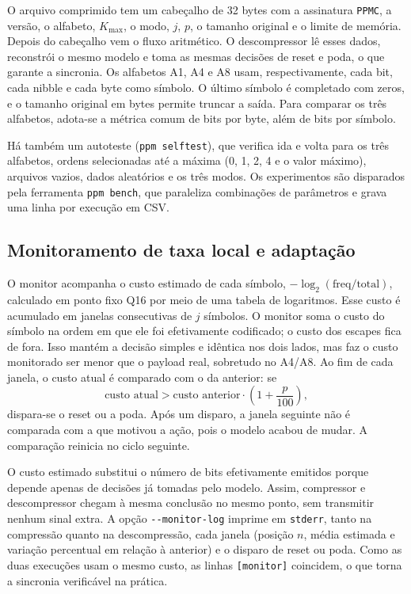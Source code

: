 \documentclass[12pt,a4paper]{article}
\begin{document}
O arquivo comprimido tem um cabe\c{c}alho de 32 bytes com a assinatura
\texttt{PPMC}, a vers\~ao, o alfabeto, $K_{\max}$, o modo, $j$, $p$, o tamanho
original e o limite de mem\'oria. Depois do cabe\c{c}alho vem o fluxo
aritm\'etico. O descompressor l\^e esses dados, reconstr\'oi o mesmo modelo e toma
as mesmas decis\~oes de reset e poda, o que garante a sincronia. Os alfabetos A1,
A4 e A8 usam, respectivamente, cada bit, cada nibble e cada byte como s\'imbolo. O
\'ultimo s\'imbolo \'e completado com zeros, e o tamanho original em bytes permite
truncar a sa\'ida. Para comparar os tr\^es alfabetos, adota-se a m\'etrica comum de
bits por byte, al\'em de bits por s\'imbolo.

H\'a tamb\'em um autoteste (\texttt{ppm selftest}), que verifica ida e volta para
os tr\^es alfabetos, ordens selecionadas at\'e a m\'axima (0, 1, 2, 4 e o valor
m\'aximo), arquivos vazios, dados aleat\'orios e os tr\^es modos. Os experimentos
s\~ao disparados pela ferramenta \texttt{ppm bench}, que paraleliza
combina\c{c}\~oes de par\^ametros e grava uma linha por execu\c{c}\~ao em CSV.

\subsection{Monitoramento de taxa local e adapta\c{c}\~ao}
O monitor acompanha o custo estimado de cada s\'imbolo,
$-\log_2(\mathrm{freq}/\mathrm{total})$, calculado em ponto fixo Q16 por meio de
uma tabela de logaritmos. Esse custo \'e acumulado em janelas consecutivas de $j$
s\'imbolos. O monitor soma o custo do s\'imbolo na ordem em que ele foi
efetivamente codificado; o custo dos escapes fica de fora. Isso mant\'em a
decis\~ao simples e id\^entica nos dois lados, mas faz o custo monitorado ser menor
que o payload real, sobretudo no A4/A8. Ao fim de cada janela, o custo atual \'e
comparado com o da anterior: se
\begin{equation}
  \text{custo atual} > \text{custo anterior} \cdot \left(1 + \frac{p}{100}\right),
\end{equation}
dispara-se o reset ou a poda. Ap\'os um disparo, a janela seguinte n\~ao \'e
comparada com a que motivou a a\c{c}\~ao, pois o modelo acabou de mudar. A
compara\c{c}\~ao reinicia no ciclo seguinte.

O custo estimado substitui o n\'umero de bits efetivamente emitidos porque
depende apenas de decis\~oes j\'a tomadas pelo modelo. Assim, compressor e
descompressor chegam \`a mesma conclus\~ao no mesmo ponto, sem transmitir nenhum
sinal extra. A op\c{c}\~ao \texttt{-{}-monitor-log} imprime em \texttt{stderr},
tanto na compress\~ao quanto na descompress\~ao, cada janela (posi\c{c}\~ao $n$,
m\'edia estimada e varia\c{c}\~ao percentual em rela\c{c}\~ao \`a anterior) e o
disparo de reset ou poda. Como as duas execu\c{c}\~oes usam o mesmo custo, as
linhas \texttt{[monitor]} coincidem, o que torna a sincronia verific\'avel na
pr\'atica.
\end{document}
